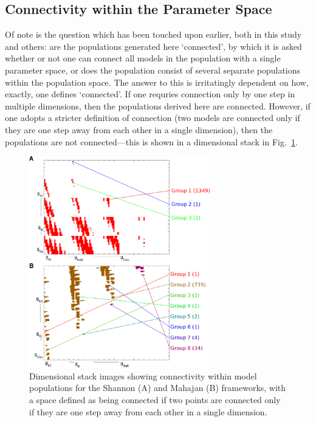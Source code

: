 \documentclass[../thesis-main.tex]{subfiles}
\begin{document}
\subsection{Connectivity within the Parameter Space}
\label{subsec:space-connectivity}
Of note is the question which has been touched upon earlier, both in this study and others: are the populations generated here `connected', by which it is asked whether or not one can connect all models in the population with a single parameter space, or does the population consist of several separate populations within the population space. The answer to this is irritatingly dependent on how, exactly, one defines `connected'. If one requries connection only by one step in multiple dimensions, then the populations derived here are connected. However, if one adopts a stricter definition of connection (two models are connected only if they are one step away from each other in a single dimension), then the populations are not connected---this is shown in a dimensional stack in Fig.~\ref{fig:space-connectivity}.
\begin{figure}
 \centering
 \includegraphics[width=0.7\textwidth]{space-connectivity}
 \caption[Connectivity within model populations.]{Dimensional stack images showing connectivity within model populations for the Shannon (A) and Mahajan (B) frameworks, with a space defined as being connected if two points are connected only if they are one step away from each other in a single dimension.}
 \label{fig:space-connectivity}
\end{figure}
\end{document}
